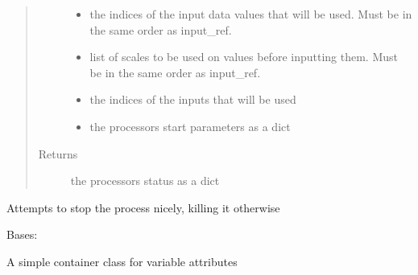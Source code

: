 \documentclass[letterpaper,10pt,english]{sphinxmanual}
\begin{document}
\begin{fulllineitems}
\begin{fulllineitems}
\begin{quote}
\begin{description}
\begin{itemize}
\item {} 
 \textendash{} the indices of the input data values that will be used.
Must be in the same order as input\_ref.

\item {} 
 \textendash{} list of scales to be used on values before inputting them.
Must be in the same order as input\_ref.

\item {} 
 \textendash{} the indices of the inputs that will be used

\item {} 
 \textendash{} the processors start parameters as a dict

\end{itemize}

\item[{Returns}] \leavevmode
the processors status as a dict

\end{description}\end{quote}

\end{fulllineitems}


\begin{fulllineitems}
\label{\detokenize{src.processors:src.processors.models.Processor.stop}}
Attempts to stop the process nicely, killing it otherwise

\end{fulllineitems}


\end{fulllineitems}


\begin{fulllineitems}
\label{\detokenize{src.processors:src.processors.models.Variable}}
Bases: 

A simple container class for variable attributes

\end{fulllineitems}
\end{document}
